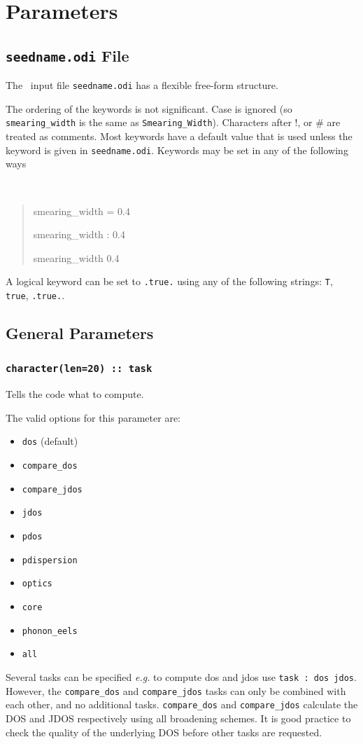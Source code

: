 \documentclass[a4paper,11pt,twoside]{book}
\begin{document}
{\chapter{Parameters}\label{chap:parameters}

\section{{\tt seedname.odi} File}
The \optados\ input file {\tt seedname.odi} has a flexible free-form
structure.

The ordering of the keywords is not significant. Case is ignored (so
\verb#smearing_width# is the same as \verb#Smearing_Width#). Characters after !, or \#
are treated as comments. Most keywords have a default value that is
used unless the keyword is given in {\tt seedname.odi}. Keywords may be set
in any of the following ways
{\tt
\begin{quote}
smearing\_width = 0.4

smearing\_width : 0.4

smearing\_width   0.4
\end{quote} }
A logical keyword can be set to {\tt .true.} using any of the following
strings: {\tt T}, {\tt true}, {\tt .true.}.


\clearpage


\section{General Parameters}
\subsection[task]{\tt character(len=20) :: task}

Tells the code what to compute.

The valid options for this parameter are:
\begin{itemize}
\item[{\bf --}]  \verb#dos# (default)
\item[{\bf --}]  \verb#compare_dos#
\item[{\bf --}]  \verb#compare_jdos#
\item[{\bf --}]  \verb#jdos#
\item[{\bf --}]  \verb#pdos#
\item[{\bf --}]  \verb#pdispersion#
\item[{\bf --}]  \verb#optics#
\item[{\bf --}]  \verb#core#
\item[{\bf --}]  \verb#phonon_eels#
\item[{\bf --}]  \verb#all#
\end{itemize}
Several tasks can be specified \emph{e.g.} to compute dos and jdos use
\verb#task : dos jdos#.
However, the \verb#compare_dos# and \verb#compare_jdos# tasks can only be combined with each other, and no additional tasks.
\verb#compare_dos# and \verb#compare_jdos# calculate the DOS and JDOS respectively using all broadening schemes. It is good practice to check the quality of the underlying DOS before other tasks are requested.

}
\end{document}
